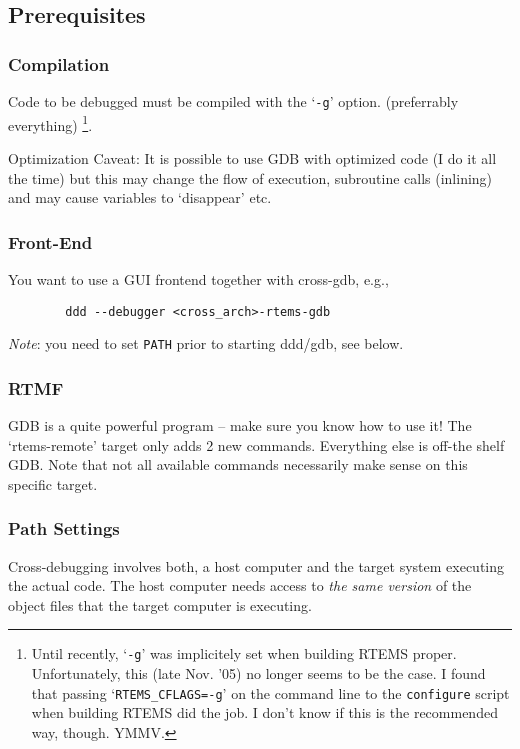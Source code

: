 \documentclass{article}
\newcommand{\cmd}[1]{{\tt #1}}
\begin{document}
\subsection{Prerequisites}
\subsubsection*{Compilation}
	Code to be debugged must be compiled with the `{\tt -g}' option.
    (preferrably everything)%
\footnote{Until recently, `{\tt -g}' was implicitely set when building
RTEMS proper. Unfortunately, this (late Nov. '05) no longer seems to be
the case. I found that passing `\mbox{\tt RTEMS\_CFLAGS=-g}' on the command
line to the \cmd{configure} script when building RTEMS did the job. I
don't know if this is the recommended way, though. YMMV.
}.

	Optimization Caveat: It is possible to use GDB with optimized
	code (I do it all the time) but this may change the flow
	of execution, subroutine calls (inlining) and may cause
	variables to `disappear' etc.

\subsubsection*{Front-End}
	You want to use a GUI frontend together with cross-gdb, e.g.,
\begin{verbatim}
		ddd --debugger <cross_arch>-rtems-gdb
\end{verbatim}

	{\em Note\/}: you need to set {\tt PATH} prior to starting ddd/gdb,
    see below.  

\subsubsection*{RTMF}
	GDB is a quite powerful program -- make sure you know how to
	use it! The `rtems-remote' target only adds 2 new commands.
	Everything else is off-the shelf GDB.
	Note that not all available commands necessarily make sense
	on this specific target.

\subsubsection*{Path Settings}
    Cross-debugging involves both, a host computer and the
    target system executing the actual code. The host computer
    needs access to {\em the same version} of the object files
	that the target computer is executing.
\end{document}
